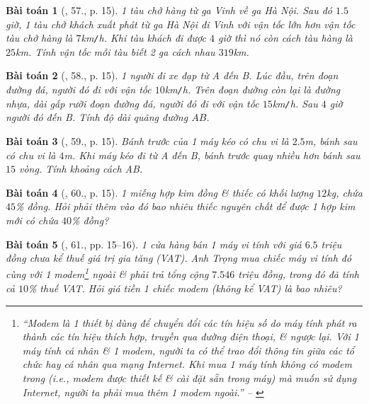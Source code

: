 \documentclass{article}
\newtheorem{baitoan}{Bài toán}
\begin{document}
\begin{baitoan}[\cite{SBT_Toan_8_tap_2}, 57., p. 15]
	1 tàu chở hàng từ ga Vinh về ga Hà Nội. Sau đó $1.5$ giờ, 1 tàu chở khách xuất phát từ ga Hà Nội đi Vinh với vận tốc lớn hơn vận tốc tàu chở hàng là $7$\emph{km\texttt{/}h}. Khi tàu khách đi được $4$ giờ thì nó còn cách tàu hàng là $25$\emph{km}. Tính vận tốc mỗi tàu biết 2 ga cách nhau $319$\emph{km}.
\end{baitoan}

\begin{baitoan}[\cite{SBT_Toan_8_tap_2}, 58., p. 15]
	1 người đi xe đạp từ A đến B. Lúc đầu, trên đoạn đường đá, người đó đi với vận tốc $10$\emph{km\texttt{/}h}. Trên đoạn đường còn lại là đường nhựa, dài gấp rưỡi đoạn đường đá, người đó đi với vận tốc $15$\emph{km\texttt{/}h}. Sau $4$ giờ người đó đến B. Tính độ dài quãng đường $AB$.
\end{baitoan}

\begin{baitoan}[\cite{SBT_Toan_8_tap_2}, 59., p. 15]
	Bánh trước của 1 máy kéo có chu vi là $2.5$\emph{m}, bánh sau có chu vi là $4$\emph{m}. Khi máy kéo đi từ A đến B, bánh trước quay nhiều hơn bánh sau $15$ vòng. Tính khoảng cách AB.
\end{baitoan}

\begin{baitoan}[\cite{SBT_Toan_8_tap_2}, 60., p. 15]
	1 miếng hợp kim đồng \& thiếc có khối lượng $12$\emph{kg}, chứa $45$\% đồng. Hỏi phải thêm vào đó bao nhiêu thiếc nguyên chất để được 1 hợp kim mới có chứa $40$\% đồng?
\end{baitoan}

\begin{baitoan}[\cite{SBT_Toan_8_tap_2}, 61., pp. 15--16]
	1 cửa hàng bán 1 máy vi tính với giá $6.5$ triệu đồng chưa kể thuế giá trị gia tăng (VAT). Anh Trọng mua chiếc máy vi tính đó cùng với 1 modem\footnote{``Modem là 1 thiết bị dùng để chuyển đổi các tín hiệu số do máy tính phát ra thành các tín hiệu thích hợp, truyền qua đường điện thoại, \& ngược lại. Với 1 máy tính cá nhân \& 1 modem, người ta có thể trao đổi thông tin giữa các tổ chức hay cá nhân qua mạng Internet. Khi mua 1 máy tính không có modem trong (i.e., modem được thiết kế \& cài đặt sẵn trong máy) mà muốn sử dụng Internet, người ta phải mua thêm 1 modem ngoài.'' -- \cite[p. 15]{SBT_Toan_8_tap_2}} ngoài \& phải trả tổng cộng $7.546$ triệu đồng, trong đó đã tính cả $10$\% thuế VAT. Hỏi giá tiền 1 chiếc modem (không kể VAT) là bao nhiêu?
\end{baitoan}
\end{document}

